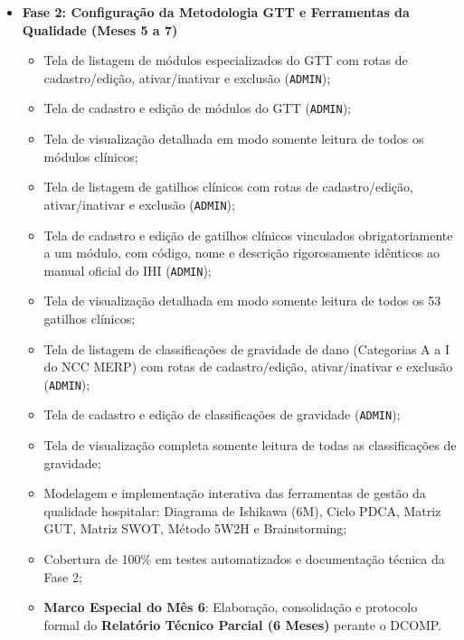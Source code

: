 \begin{itemize}
    \item \textbf{Fase 2: Configuração da Metodologia GTT e Ferramentas da Qualidade (Meses 5 a 7)}
    \begin{itemize}
        \item Tela de listagem de módulos especializados do GTT com rotas de cadastro/edição, ativar/inativar e exclusão (\texttt{ADMIN});
        \item Tela de cadastro e edição de módulos do GTT (\texttt{ADMIN});
        \item Tela de visualização detalhada em modo somente leitura de todos os módulos clínicos;
        \item Tela de listagem de gatilhos clínicos com rotas de cadastro/edição, ativar/inativar e exclusão (\texttt{ADMIN});
        \item Tela de cadastro e edição de gatilhos clínicos vinculados obrigatoriamente a um módulo, com código, nome e descrição rigorosamente idênticos ao manual oficial do IHI (\texttt{ADMIN});
        \item Tela de visualização detalhada em modo somente leitura de todos os 53 gatilhos clínicos;
        \item Tela de listagem de classificações de gravidade de dano (Categorias A a I do NCC MERP) com rotas de cadastro/edição, ativar/inativar e exclusão (\texttt{ADMIN});
        \item Tela de cadastro e edição de classificações de gravidade (\texttt{ADMIN});
        \item Tela de visualização completa somente leitura de todas as classificações de gravidade;
        \item Modelagem e implementação interativa das ferramentas de gestão da qualidade hospitalar: Diagrama de Ishikawa (6M), Ciclo PDCA, Matriz GUT, Matriz SWOT, Método 5W2H e Brainstorming;
        \item Cobertura de 100\% em testes automatizados e documentação técnica da Fase 2;
        \item \textbf{Marco Especial do Mês 6}: Elaboração, consolidação e protocolo formal do \textbf{Relatório Técnico Parcial (6 Meses)} perante o DCOMP.
    \end{itemize}


\end{itemize}
